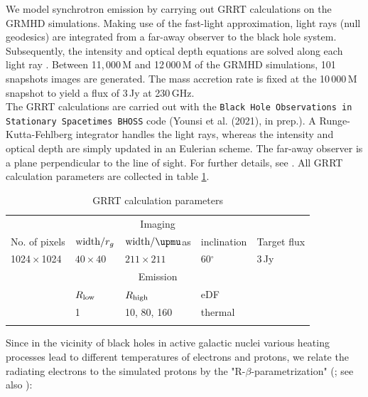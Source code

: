 \documentclass[a4paper,11pt]{article}
\begin{document}
We model synchrotron emission by carrying out GRRT calculations on the GRMHD simulations. Making use of the fast-light approximation, light rays (null geodesics) are integrated from a far-away observer to the black hole system. Subsequently, the intensity and optical depth equations are solved along each light ray \cite{Younsi2012}. Between 11,\,000\,M and 12\,000\,M of the GRMHD simulations, 101 snapshots images are generated. The mass accretion rate is fixed at the 10\,000\,M snapshot to yield a flux of 3\,Jy at 230\,GHz. \\
The GRRT calculations are carried out with the \texttt{Black Hole Observations in Stationary Spacetimes BHOSS} code (Younsi et al. (2021), in prep.). A Runge-Kutta-Fehlberg integrator handles the light rays, whereas the intensity and optical depth are simply updated in an Eulerian scheme. The far-away observer is a plane perpendicular to the line of sight. For further details, see \cite{Younsi2016}. All GRRT calculation parameters are collected in table \ref{tab:grrt_params}.  
\begin{table}[h!]
	\vspace{-0pt}
	\centering
	\caption{GRRT calculation parameters}
	\begin{tabular}{lllll} 
		\hline \hline
		
		\multicolumn{5}{c}{Imaging}\\
		No. of pixels & ${\rm width}/r_g$  & ${\rm width}/\upmu$as& inclination & Target flux\\
		\hline
		1024\,$\times$\,1024 & $40\times40$ & $211\times211$ &60$^\circ$ &3\,Jy\\
		\hline 		
		
		\multicolumn{5}{c}{Emission}\\
		&$R_{\rm low}$ & $R_{\rm high}$& eDF \\
		\hline
		&1& 10, 80, 160 & thermal \\
		\hline 		

		\label{tab:grrt_params}
	\end{tabular} 
\end{table} 
Since in the vicinity of black holes in active galactic nuclei various heating processes lead to different temperatures of electrons and protons, we relate the radiating electrons to the simulated protons by the "R-$\beta$-parametrization" (\cite{Moscibrodzka2016}; see also \cite{Cruz-Osorio2021,Fromm2021b,Davelaar2019}):
\end{document}
